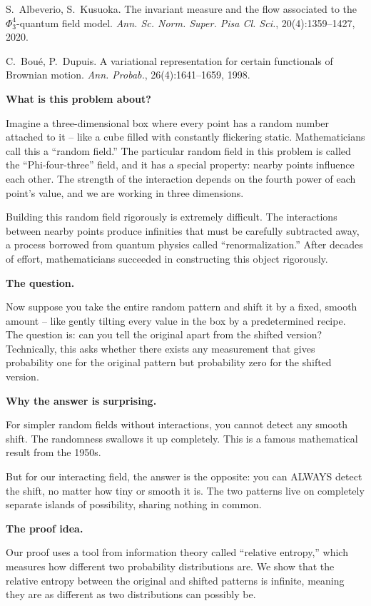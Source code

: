  S.~Albeverio, S.~Kusuoka.
The invariant measure and the flow associated to the $\Phi^4_3$-quantum
field model. \emph{Ann. Sc. Norm. Super. Pisa Cl. Sci.}, 20(4):1359--1427, 2020.

 C.~Bou\'{e}, P.~Dupuis.
A variational representation for certain functionals of Brownian motion.
\emph{Ann. Probab.}, 26(4):1641--1659, 1998.


\textbf{What is this problem about?}

Imagine a three-dimensional box where every point has a random number
attached to it -- like a cube filled with constantly flickering static.
Mathematicians call this a ``random field.'' The particular random field
in this problem is called the ``Phi-four-three'' field, and it has a
special property: nearby points influence each other. The strength of
the interaction depends on the fourth power of each point's value, and
we are working in three dimensions.

Building this random field rigorously is extremely difficult. The
interactions between nearby points produce infinities that must be
carefully subtracted away, a process borrowed from quantum physics
called ``renormalization.'' After decades of effort, mathematicians
succeeded in constructing this object rigorously.

\textbf{The question.}

Now suppose you take the entire random pattern and shift it by a fixed,
smooth amount -- like gently tilting every value in the box by a
predetermined recipe. The question is: can you tell the original
apart from the shifted version? Technically, this asks whether there
exists any measurement that gives probability one for the original
pattern but probability zero for the shifted version.

\textbf{Why the answer is surprising.}

For simpler random fields without interactions, you cannot detect
any smooth shift. The randomness swallows it up completely. This is
a famous mathematical result from the 1950s.

But for our interacting field, the answer is the opposite: you can
ALWAYS detect the shift, no matter how tiny or smooth it is. The
two patterns live on completely separate islands of possibility,
sharing nothing in common.

\textbf{The proof idea.}

Our proof uses a tool from information theory called ``relative
entropy,'' which measures how different two probability distributions
are. We show that the relative entropy between the original and
shifted patterns is infinite, meaning they are as different as two
distributions can possibly be.

